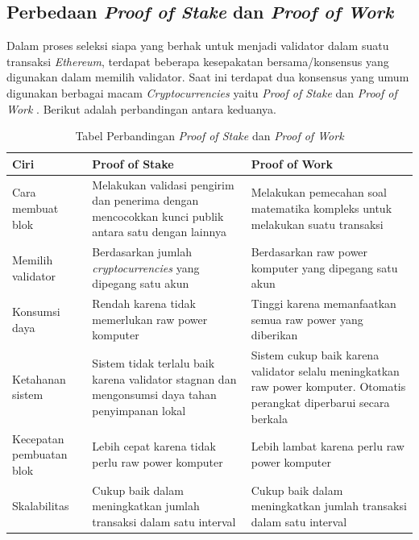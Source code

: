 \subsection{Perbedaan \emph{Proof of Stake} dan \emph{Proof of Work}}
\label{subsec:powandposdiffer}

Dalam proses seleksi siapa yang berhak untuk menjadi validator dalam suatu transaksi \emph{Ethereum}, terdapat beberapa kesepakatan bersama/konsensus yang digunakan dalam memilih validator. Saat ini terdapat dua konsensus yang umum digunakan berbagai macam \emph{Cryptocurrencies} yaitu \emph{Proof of Stake} dan \emph{Proof of Work} \cite{9388487}. Berikut adalah perbandingan antara keduanya.

\begin{longtable}{|p{4cm}|p{5cm}|p{5cm}|}
  \caption{Tabel Perbandingan \emph{Proof of Stake} dan \emph{Proof of Work}}
  \label{tb:posandpowdifference}\\
  \hline
  \rowcolor[HTML]{C0C0C0}
  \textbf{Ciri} & \textbf{Proof of Stake} & \textbf{Proof of Work} \\
  \hline
Cara membuat blok & Melakukan validasi pengirim dan penerima dengan mencocokkan kunci publik antara satu dengan lainnya & Melakukan pemecahan soal matematika kompleks untuk melakukan suatu transaksi \\
  \hline
  Memilih validator & Berdasarkan jumlah \emph{cryptocurrencies} yang dipegang satu akun & Berdasarkan raw power komputer yang dipegang satu akun \\
  \hline
  Konsumsi daya & Rendah karena tidak memerlukan raw power komputer & Tinggi karena memanfaatkan semua raw power yang diberikan \\
 \hline
 Ketahanan sistem & Sistem tidak terlalu baik karena validator stagnan dan mengonsumsi daya tahan penyimpanan lokal & Sistem cukup baik karena validator selalu meningkatkan raw power komputer. Otomatis perangkat diperbarui secara berkala\\
 \hline
Kecepatan pembuatan blok & Lebih cepat karena tidak perlu raw power komputer & Lebih lambat karena perlu raw power komputer\\
\hline
  Skalabilitas & Cukup baik dalam meningkatkan jumlah transaksi dalam satu interval & Cukup baik dalam meningkatkan jumlah transaksi dalam satu interval\\
\hline 
\end{longtable}